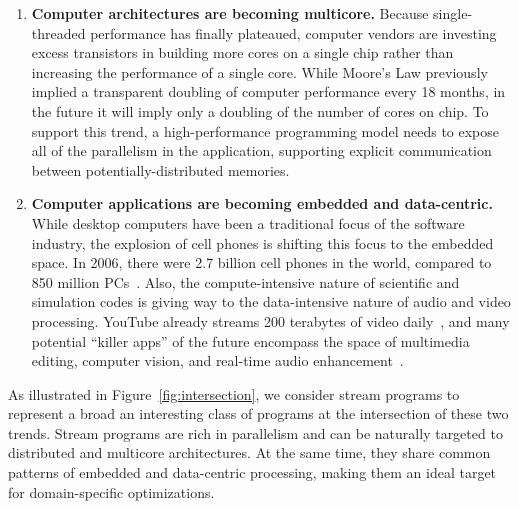 

\begin{enumerate}

\item {\bf Computer architectures are becoming multicore.}  Because
  single-threaded performance has finally plateaued, computer vendors
  are investing excess transistors in building more cores on a single
  chip rather than increasing the performance of a single core.  While
  Moore's Law previously implied a transparent doubling of computer
  performance every 18 months, in the future it will imply only a
  doubling of the number of cores on chip.  To support this trend, a
  high-performance programming model needs to expose all of the
  parallelism in the application, supporting explicit communication
  between potentially-distributed memories.

\item {\bf Computer applications are becoming embedded and
  data-centric.}  While desktop computers have been a traditional
  focus of the software industry, the explosion of cell phones is
  shifting this focus to the embedded space.  In 2006, there were 2.7
  billion cell phones in the world, compared to 850 million
  PCs~\cite{ITU}.  Also, the compute-intensive nature of scientific
  and simulation codes is giving way to the data-intensive nature of
  audio and video processing.  YouTube already streams 200 terabytes
  of video daily~\cite{Wikipedia-youtube}, and many potential ``killer
  apps'' of the future encompass the space of multimedia editing,
  computer vision, and real-time audio
  enhancement~\cite{Berkeley-view,Intel-report}.

\end{enumerate}

As illustrated in Figure~\ref{fig:intersection}, we consider stream
programs to represent a broad an interesting class of programs at the
intersection of these two trends.  Stream programs are rich in
parallelism and can be naturally targeted to distributed and multicore
architectures.  At the same time, they share common patterns of
embedded and data-centric processing, making them an ideal target for
domain-specific optimizations.

